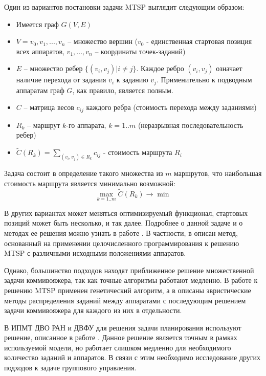 \documentclass[a4paper,14pt,russian]{article}
\begin{document}
Один из вариантов постановки задачи MTSP выглядит следующим образом:
\begin{itemize}
\item Имеется граф $G(V, E)$
\item $V = {v_0, v_1, ... , v_n}$ -- множество вершин ($v_0$ - единственная стартовая позиция всех аппаратов, $v_1, ..., v_n$ -- координаты точек-заданий)
\item $E$ -- множество ребер $\{(v_i, v_j) | i \neq j\}$. Каждое ребро $(v_i, v_j)$ означает наличие перехода от задания $v_i$ к заданию $v_j$. Применительно к подводным аппаратам граф $G$, как правило, является полным.
\item $C$ -- матрица весов $c_{i j}$ каждого ребра (стоимость перехода между заданиями)
\item $R_k$ -- маршрут $k$-го аппарата, $k=1..m$ (неразрывная последовательность ребер)
\item $\widetilde{C}(R_k) = \displaystyle\sum_{(v_i, v_j) \in R_k} c_{i j}$ - стоимость маршрута $R_i$
\end{itemize}
Задача состоит в определение такого множества из $m$ маршрутов, что наибольшая стоимость маршрута является минимально возможной:
\begin{equation} \label{mtsp1}
\displaystyle \max_{k=1..m} \widetilde{C}(R_k) \rightarrow \min
\end{equation}

В других вариантах может меняться оптимизируемый функционал, стартовых позиций может быть несколько, и так далее. Подробнее о данной задаче и о методах ее решения можно узнать в работе \cite{bektas2006multiple}.
В частности, в \cite{binaryprog} описан метод, основанный на применении целочисленного программирования к решению MTSP с различными исходными положениями аппаратов.

Однако, большинство подходов находят приближенное решение множественной задачи коммивояжера, так как точные алгоритмы работают медленно. В работе \cite{kiraly2010novel} к решению MTSP применен генетический алгоритм, а в \cite{na2007heurisic} описаны эвристические методы распределения заданий между аппаратами с последующим решением задачи коммивояжера для каждого из них в отдельности.

В ИПМТ ДВО РАН и ДВФУ для решения задачи планирования используют решение, описанное в работе \cite{tuphanov1}. Данное решение является точным в рамках используемой модели, но работает слишком медленно для необходимого количество заданий и аппаратов. В связи с этим необходимо исследование других подходов к задаче группового управления.
\end{document}
